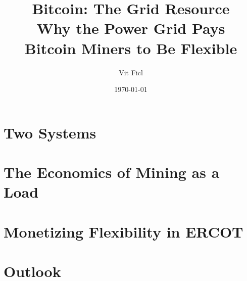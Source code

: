 \documentclass[a5paper,10pt]{book}
\title{Bitcoin: The Grid Resource\\[0.5em]
  \large Why the Power Grid Pays\\ \large Bitcoin Miners to Be Flexible}
\author{Vit Ficl}
\date{\today}
\begin{document}
\frontmatter

\maketitle

\tableofcontents







\mainmatter

\part{Two Systems}





\part{The Economics of Mining as a Load}




\part{Monetizing Flexibility in ERCOT}






\part{Outlook}



\backmatter





\printbibliography
\end{document}

